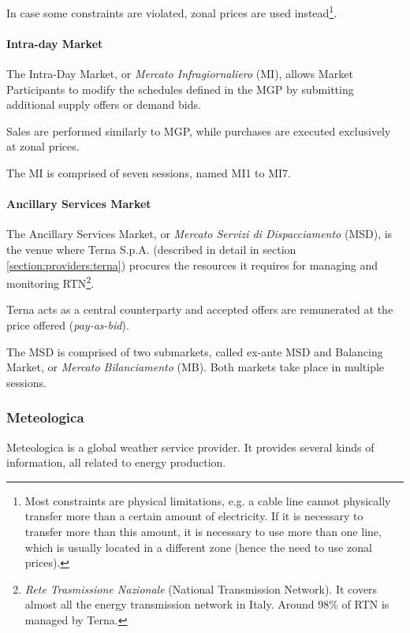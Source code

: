         In case some constraints are violated, zonal prices are used instead\footnote{Most constraints are physical limitations, e.g. a cable line cannot physically transfer more than a certain amount of electricity. If it is necessary to transfer more than this amount, it is necessary to use more than one line, which is usually located in a different zone (hence the need to use zonal prices).}.
    
    \paragraph{Intra-day Market}
        The Intra-Day Market, or \textit{Mercato Infragiornaliero} (MI), allows Market Participants to modify the schedules defined in the MGP by submitting additional supply offers or demand bids.
        
        Sales are performed similarly to MGP, while purchases are executed exclusively at zonal prices.
        
        The MI is comprised of seven sessions, named MI1 to MI7.
    
    \paragraph{Ancillary Services Market}
        The Ancillary Services Market, or \textit{Mercato Servizi di Dispacciamento} (MSD), is the venue where Terna S.p.A. (described in detail in section \ref{section:providers:terna}) procures the resources it requires for managing and monitoring RTN\footnote{
            \textit{Rete Trasmissione Nazionale} (National Transmission Network).
            It covers almost all the energy transmission network in Italy.
            Around 98\% of RTN is managed by Terna.\label{footnote:rtn}
        }.
        
        Terna acts as a central counterparty and accepted offers are remunerated at the price offered (\textit{pay-as-bid}).
    
        The MSD is comprised of two submarkets, called ex-ante MSD and Balancing Market, or \textit{Mercato Bilanciamento} (MB).
        Both markets take place in multiple sessions.

\subsubsection{Meteologica}
    Meteologica is a global weather service provider.
    It provides several kinds of information, all related to energy production.\cite{bib:meteologica:services}
    
